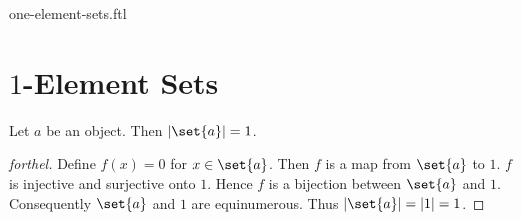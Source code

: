 \documentclass{naproche-library}
\begin{document}
\begin{smodule}{one-element-sets.ftl}

  \section*{$1$-Element Sets}

  \begin{proposition}[forthel,id=SET_THEORY_07_836893598023680]
    Let $a$ be an object.
    Then $|\set{a}| = 1$.
  \end{proposition}
  \begin{proof}[forthel]
    Define $f(x) = 0$ for $x \in \set{a}$.
    Then $f$ is a map from $\set{a}$ to $1$.
    $f$ is injective and surjective onto $1$.
    Hence $f$ is a bijection between $\set{a}$ and $1$.
    Consequently $\set{a}$ and $1$ are equinumerous.
    Thus $|\set{a}| = |1| = 1$.
  \end{proof}
\end{smodule}
\end{document}

